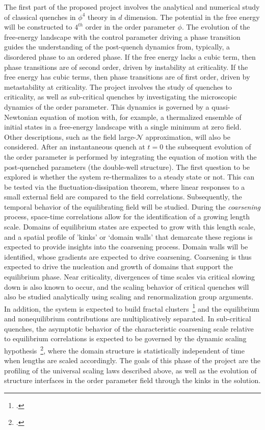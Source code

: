 \documentclass[a4paper,11pt]{article}
\begin{document}
The first part of the proposed project involves the analytical and numerical study of classical quenches in $\phi^4$ theory in  {$d$} 
dimension. The potential in the free energy will be constructed to $4^{th}$ order in the order parameter $\phi$. The evolution of the free-energy landscape with the control parameter driving a phase transition guides the understanding of the post-quench dynamics from, typically, a disordered phase to an ordered phase. If the free energy lacks a cubic term, then phase transitions are of second order, driven by instability at criticality. If the free energy has cubic terms, then phase transitions are of first order, driven by metastability at criticality. The project involves the study of quenches to criticality, as well as sub-critical quenches by investigating the microscopic dynamics of the order parameter. This dynamics is governed by a quasi-Newtonian equation of motion with,  {for example, 
a thermalized ensemble of initial states in a free-energy landscape with a single minimum at zero field}. Other descriptions, such as the field 
large-$\mathcal{N}$ approximation, will also be considered. After an instantaneous quench at $t=0$ the subsequent evolution of the order parameter is performed by integrating the equation of motion with the post-quenched parameters  {(the double-well structure)}. The first question to be explored is whether the system re-thermalizes to a steady state or not. This can be tested via the fluctuation-dissipation theorem, where linear responses to a small external field are compared to the field correlations. Subsequently, the temporal behavior of the equilibrating field will be studied. During the \textit{coarsening} process, space-time correlations allow for the identification of a growing length scale. Domains of equilibrium states are expected to grow with this length scale, and a spatial profile of 'kinks' or  {`domain walls'} that demarcate these regions is expected to provide insights into the coarsening process. Domain walls will be identified, whose gradients are expected to 
drive coarsening. Coarsening is thus expected to drive the nucleation and growth of domains that support the equilibrium phase. Near criticality, divergences of time scales via critical slowing down is also known to occur, and the scaling behavior of critical quenches will also be studied analytically using scaling and renormalization group arguments. In addition, the system is expected to build fractal clusters~\footcites{fractal1}{fractal2}{fractal3}
and the equilibrium and nonequilibrium contributions are multiplicatively separated. In sub-critical quenches, the asymptotic behavior of the characteristic coarsening scale relative to equilibrium correlations is expected to be governed by the dynamic scaling hypothesis~\footcite{dynscal}, where the domain structure is statistically independent of time when lengths are scaled accordingly. The goals of this phase of the project are the profiling of the universal scaling laws described above, as well as the evolution of structure interfaces in the order parameter field through the kinks in the solution.
\end{document}
